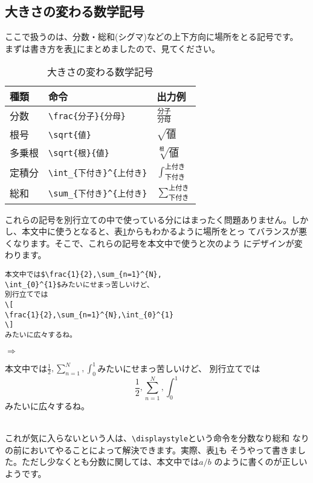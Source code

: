 \subsection{大きさの変わる数学記号}
ここで扱うのは、分数・総和(シグマ)などの上下方向に場所をとる記号です。
まずは書き方を表\ref{tab:frac}にまとめましたので、見てください。
\begin{table}[htbp]
\begin{center}
\caption{大きさの変わる数学記号}
\label{tab:frac}
\begin{tabular}{lll}
\hline
種類   & 命令        & 出力例 \\
\hline
分数   & \verb+\frac{分子}{分母}+
       & $\displaystyle \frac{\text{分子}}{\text{分母}}$ \\
根号   & \verb+\sqrt{値}+
       & $\displaystyle \sqrt{\text{値}}$ \\
多乗根 & \verb+\sqrt{根}{値}+
       & $\displaystyle \sqrt[\text{根}]{\text{値}}$ \\
定積分 & \verb+\int_{下付き}^{上付き}+
       & $\displaystyle \int_{\text{下付き}}^{\text{上付き}}$ \\
総和   & \verb+\sum_{下付き}^{上付き}+
       & $\displaystyle \sum_{\text{下付き}}^{\text{上付き}}$ \\
\hline
\end{tabular}
\end{center}
\end{table}
これらの記号を別行立ての中で使っている分にはまったく問題ありません。しか
し、本文中に使うとなると、表\ref{tab:frac}からもわかるように場所をとっ
てバランスが悪くなります。そこで、これらの記号を本文中で使うと次のよう
にデザインが変わります。\\
\begin{minipage}[c]{.50\textwidth}
\begin{screen}
\small
\begin{verbatim}
本文中では$\frac{1}{2},\sum_{n=1}^{N},
\int_{0}^{1}$みたいにせまっ苦しいけど、
別行立てでは
\[
\frac{1}{2},\sum_{n=1}^{N},\int_{0}^{1}
\]
みたいに広々するね。
\end{verbatim}
\end{screen}
\end{minipage}%
$\Rightarrow$
\begin{minipage}{.45\textwidth}
\begin{shadebox}
本文中では$\frac{1}{2},\sum_{n=1}^{N},
\int_{0}^{1}$みたいにせまっ苦しいけど、
別行立てでは
\[
\frac{1}{2},\sum_{n=1}^{N},\int_{0}^{1}
\]
みたいに広々するね。
\end{shadebox}
\end{minipage}
\vspace*{1mm}\\
これが気に入らないという人は、\verb+\displaystyle+という命令を分数なり総和
なりの前においてやることによって解決できます。実際、表\ref{tab:frac}も
そうやって書きました。ただし少なくとも分数に関しては、本文中では$a/b$
のように書くのが正しいようです。\\

